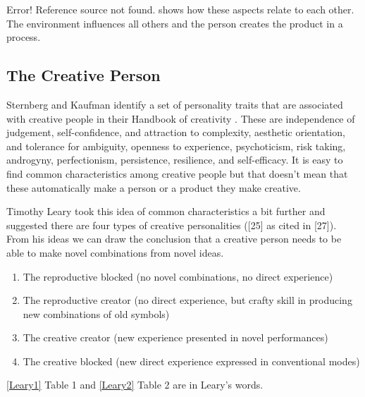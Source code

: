Error! Reference source not found. shows how these aspects relate to each other. The environment influences all others and the person creates the product in a process.

\subsection{The Creative Person}

Sternberg and Kaufman identify a set of personality traits that are associated with creative people in their Handbook of creativity \citep{Sternberg1999, Sternberg1999}. These are independence of judgement, self-confidence, and attraction to complexity, aesthetic orientation, and tolerance for ambiguity, openness to experience, psychoticism, risk taking, androgyny, perfectionism, persistence, resilience, and self-efficacy. It is easy to find common characteristics among creative people but that doesn't mean that these automatically make a person or a product they make creative.

Timothy Leary took this idea of common characteristics a bit further and suggested there are four types of creative personalities ([25] as cited in [27]). From his ideas we can draw the conclusion that a creative person needs to be able to make novel combinations from novel ideas.

\begin{enumerate}
  \item The reproductive blocked (no novel combinations, no direct experience)
  \item The reproductive creator (no direct experience, but crafty skill in producing new combinations of old symbols)
  \item The creative creator (new experience presented in novel performances)
  \item The creative blocked (new direct experience expressed in conventional modes)
\end{enumerate}

\ref{Leary1} Table 1 and \ref{Leary2} Table 2 are in Leary's words.

